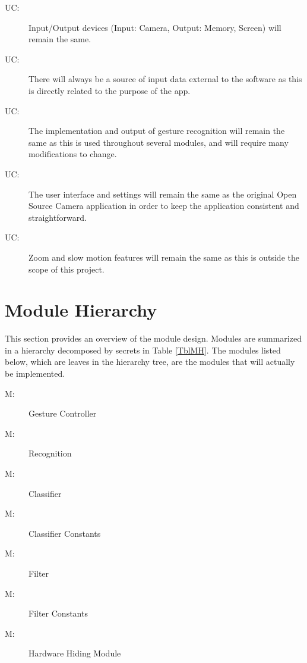 \documentclass[12pt, titlepage]{article}
\newcounter{ucnum}
\newcommand{\uctheucnum}{UC\theucnum}
\newcounter{mnum}
\newcommand{\mthemnum}{M\themnum}
\begin{document}
\begin{description}
\item[ \uctheucnum \label{ucIO}:] Input/Output devices
  (Input: Camera, Output: Memory, Screen) will remain the same.
\item[ \uctheucnum \label{ucInput}:] There will always be
  a source of input data external to the software as this is directly related to the purpose of the app.
\item[ \uctheucnum \label{ucInput}:] The implementation and output of gesture recognition will remain the same as this is used throughout several modules, and will require many modifications to change.
\item[ \uctheucnum \label{ucInput}:] The user interface and settings will remain the same as the original Open Source Camera application in order to keep the application consistent and straightforward.
\item[ \uctheucnum \label{ucInput}:] Zoom and slow motion features will remain the same as this is outside the scope of this project.
\end{description}

\section{Module Hierarchy} \label{SecMH}

This section provides an overview of the module design. Modules are summarized
in a hierarchy decomposed by secrets in Table \ref{TblMH}. The modules listed
below, which are leaves in the hierarchy tree, are the modules that will
actually be implemented.

\begin{description}

\item [ \mthemnum \label{mGC}:] Gesture Controller
\item [ \mthemnum \label{mR}:] Recognition
\item [ \mthemnum \label{mC}:] Classifier 
\item [ \mthemnum \label{mCC}:] Classifier Constants
\item [ \mthemnum \label{mF}:] Filter 
\item [ \mthemnum \label{mFC}:] Filter Constants
\item [ \mthemnum \label{mHH}:] Hardware Hiding Module
\end{description}
\end{document}
